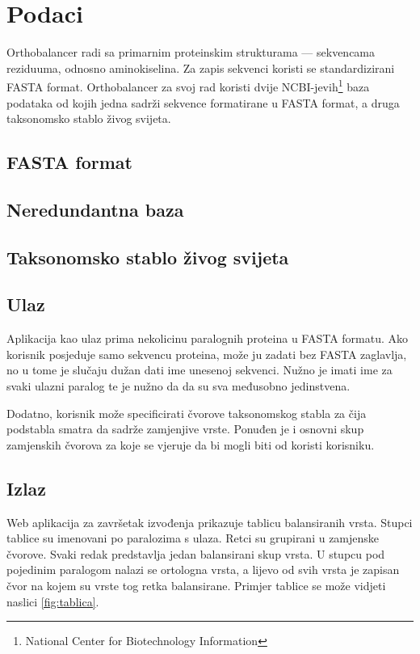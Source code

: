 \chapter{Podaci}
\label{chap:podaci}

Orthobalancer radi sa primarnim proteinskim strukturama --- sekvencama
reziduuma, odnosno aminokiselina. Za zapis sekvenci koristi se standardizirani
FASTA format. Orthobalancer za svoj rad koristi dvije
NCBI-jevih\footnote{National Center for Biotechnology Information} baza
podataka od kojih jedna sadrži sekvence formatirane u FASTA format, a druga
taksonomsko stablo živog svijeta.


\section{FASTA format}
\label{sec:fasta}


\section{Neredundantna baza}
\label{sec:nrdb}


\section{Taksonomsko stablo živog svijeta}
\label{sec:taxdb}


\section{Ulaz}
\label{sec:input}

Aplikacija kao ulaz prima nekolicinu paralognih proteina u FASTA formatu. Ako
korisnik posjeduje samo sekvencu proteina, može ju zadati bez FASTA zaglavlja,
no u tome je slučaju dužan dati ime unesenoj sekvenci. Nužno je imati ime za svaki
ulazni paralog te je nužno da da su sva međusobno jedinstvena.

Dodatno, korisnik može specificirati čvorove taksonomskog stabla za čija
podstabla smatra da sadrže zamjenjive vrste. Ponuđen je i osnovni skup
zamjenskih čvorova za koje se vjeruje da bi mogli biti od koristi korisniku.


\section{Izlaz}
\label{sec:output}

Web aplikacija za završetak izvođenja prikazuje tablicu balansiranih vrsta.
Stupci tablice su imenovani po paralozima s ulaza. Retci su grupirani u
zamjenske čvorove. Svaki redak predstavlja jedan balansirani skup vrsta. U
stupcu pod pojedinim paralogom nalazi se ortologna vrsta, a lijevo od svih vrsta
je zapisan čvor na kojem su vrste tog retka balansirane. Primjer tablice se može
vidjeti naslici \ref{fig:tablica}.

